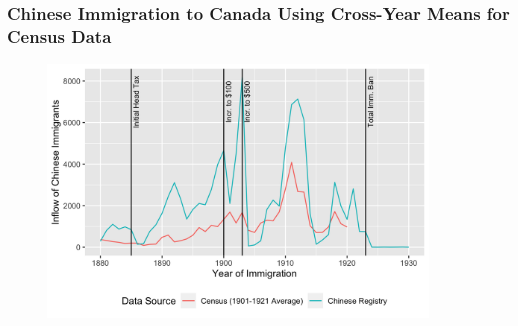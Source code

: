 \documentclass[pdf]{beamer}
\begin{document}

\begin{frame}[label = dateimmchi]
	\frametitle{Chinese Immigration to Canada Using Cross-Year Means for Census Data}
    \centering
	\begin{figure}[H]
		\begin{center}
			\includegraphics[width=0.9\textwidth]{../../figs/yrimmchi_means.png}
		\end{center}
	\end{figure}
    \hyperlink{yrimmchi}{}
\end{frame}
\end{document}
